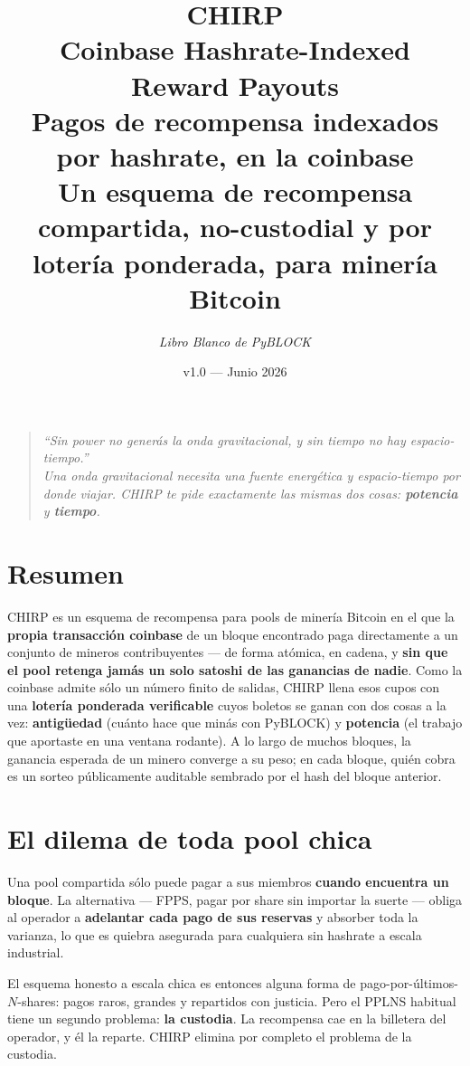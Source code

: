 \documentclass[11pt]{article}
\title{\vspace{-1.2cm}\textbf{\color{pyblockgreen}CHIRP}\\[2pt]
\large Coinbase Hashrate-Indexed Reward Payouts\\[4pt]
\normalsize Pagos de recompensa indexados por hashrate, en la coinbase\\[2pt]
\small Un esquema de recompensa compartida, no-custodial y por loter\'ia ponderada, para miner\'ia Bitcoin}
\author{\textit{Libro Blanco de PyBLOCK}}
\date{v1.0 --- Junio 2026}
\begin{document}
\maketitle

\begin{quote}\itshape
``Sin power no gener\'as la onda gravitacional, y sin tiempo no hay espacio-tiempo.''\\
\normalfont Una onda gravitacional necesita una fuente energ\'etica \emph{y} espacio-tiempo por
donde viajar. CHIRP te pide exactamente las mismas dos cosas: \textbf{potencia} y \textbf{tiempo}.
\end{quote}

\section*{Resumen}
CHIRP es un esquema de recompensa para pools de miner\'ia Bitcoin en el que la \textbf{propia
transacci\'on coinbase} de un bloque encontrado paga directamente a un conjunto de mineros
contribuyentes --- de forma at\'omica, en cadena, y \textbf{sin que el pool retenga jam\'as un solo
satoshi de las ganancias de nadie}. Como la coinbase admite s\'olo un n\'umero finito de salidas,
CHIRP llena esos cupos con una \textbf{loter\'ia ponderada verificable} cuyos boletos se ganan con
dos cosas a la vez: \textbf{antig\"uedad} (cu\'anto hace que min\'as con PyBLOCK) y \textbf{potencia}
(el trabajo que aportaste en una ventana rodante). A lo largo de muchos bloques, la ganancia
esperada de un minero converge a su peso; en cada bloque, qui\'en cobra es un sorteo p\'ublicamente
auditable sembrado por el hash del bloque anterior.

\section{El dilema de toda pool chica}
Una pool compartida s\'olo puede pagar a sus miembros \textbf{cuando encuentra un bloque}. La
alternativa --- FPPS, pagar por share sin importar la suerte --- obliga al operador a \textbf{adelantar
cada pago de sus reservas} y absorber toda la varianza, lo que es quiebra asegurada para cualquiera
sin hashrate a escala industrial.

El esquema honesto a escala chica es entonces alguna forma de pago-por-\'ultimos-$N$-shares: pagos
raros, grandes y repartidos con justicia. Pero el PPLNS habitual tiene un segundo problema:
\textbf{la custodia}. La recompensa cae en la billetera del operador, y \'el la reparte. CHIRP
elimina por completo el problema de la custodia.
\end{document}
